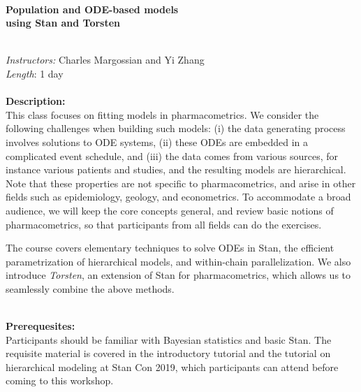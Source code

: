 \documentclass[12pt]{article}
\begin{document}
\noindent \\
\textbf{
{\Large Population and ODE-based models \\ using Stan and Torsten}}

\ \\
\textit{Instructors:} Charles Margossian and Yi Zhang \\
\textit{Length}: 1 day  \\

\ \\
\textbf{Description:} \\
This class focuses on fitting models in pharmacometrics.
We consider the following challenges when building such models: 
(i) the data generating process involves solutions to ODE systems,
(ii) these ODEs are embedded in a complicated event schedule,
and (iii) the data comes from various sources, for instance various patients and studies,
and the resulting models are hierarchical.
Note that these properties are not specific to pharmacometrics,
and arise in other fields such as epidemiology, geology, and econometrics.
To accommodate a broad audience, we will keep the core concepts general,
and review basic notions of pharmacometrics, so that participants from all fields
can do the exercises.

The course covers elementary techniques to solve ODEs in Stan,
the efficient parametrization of hierarchical models,
and within-chain parallelization.
We also introduce \textit{Torsten}, an extension of Stan for pharmacometrics,
which allows us to seamlessly combine the above methods.

\ \\
\textbf{Prerequesites:} \\
Participants should be familiar with Bayesian statistics and basic Stan.
The requisite material is covered in the introductory tutorial and the tutorial on hierarchical modeling
at Stan Con 2019, which participants can attend before coming to this workshop.
\end{document}
